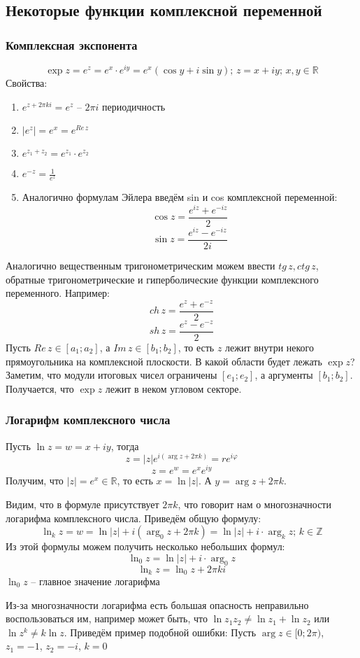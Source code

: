 \subsection{Некоторые функции комплексной переменной}
\subsubsection{Комплексная экспонента}
$$\exp{z}=e^z=e^x \cdot e^{iy}=e^x(\cos{y}+i\sin{y}); \,z = x + iy;\,x, y\in\mathbb{R}$$
Свойства:
\begin{enumerate}
    \item $e^{z + 2\pi ki} = e^z$ -- $2\pi i$ периодичность
    \item $|e^z| = e^x=e^{Re\,z}$
    \item $e^{z_1 + z_2} = e^{z_1} \cdot e^{z_2}$
    \item $e^{-z} = \frac{1}{e^z}$
    \item Аналогично формулам Эйлера введём sin и cos комплексной переменной:
          $$\cos{z}=\frac{e^{iz}+e^{-iz}}{2}$$
          $$\sin{z}=\frac{e^{iz}-e^{-iz}}{2i}$$
\end{enumerate}
Аналогично вещественным тригонометрическим можем ввести $tg\,z, ctg\,z$, обратные тригонометрические и гиперболические функции комплексного переменного. Например:
$$ch\,z=\frac{e^z+e^{-z}}{2}$$
$$sh\,z=\frac{e^z-e^{-z}}{2}$$
Пусть $Re\,z\in[a_1; a_2]$, а $Im\,z\in[b_1; b_2]$, то есть $z$ лежит внутри некого прямоугольника на комплексной плоскости. В какой области будет лежать $\exp{z}$? Заметим, что модули итоговых чисел ограничены $[e_1; e_2]$, а аргументы $[b_1; b_2]$. Получается, что $\exp{z}$ лежит в неком угловом секторе.
\subsubsection{Логарифм комплексного числа}
Пусть $\ln{z}=w=x+iy$, тогда
$$z=|z|e^{i(\arg{z}+2\pi k)}=re^{i\varphi}$$
$$z=e^{w}=e^x e^{iy}$$
Получим, что $|z|=e^x\in\mathbb{R}$, то есть $x=\ln{|z|}$. А $y=\arg{z}+2\pi k$.

Видим, что в формуле присутствует $2\pi k$, что говорит нам о многозначности логарифма комплексного числа. Приведём общую формулу:
$$\ln_k{z}=w=\ln{|z|}+i(\arg_0{z}+2\pi k) = \ln{|z|}+i \cdot \arg_k{z}; \, k\in\mathbb{Z}$$
Из этой формулы можем получить несколько небольших формул:
$$\ln_0{z}=\ln{|z|}+i \cdot \arg_0{z}$$
$$\ln_k{z}=\ln_0{z}+2\pi ki$$
$\ln_0{z}$ -- главное значение логарифма

Из-за многозначности логарифма есть большая опасность неправильно воспользоваться им, например может быть, что $\ln{z_1z_2}\neq\ln{z_1} + \ln{z_2}$ или $\ln{z^k}\neq k\ln{z}$.
Приведём пример подобной ошибки:
Пусть $\arg{z}\in[0;2\pi)$, $z_1=-1$, $z_2=-i$, $k=0$

